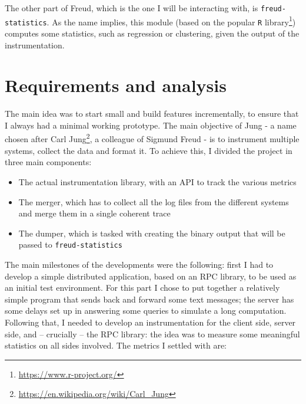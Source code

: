         The other part of Freud, which is the one I will be interacting with, is \texttt{freud-statistics}.
        As the name implies, this module (based on the popular \texttt{R} library\footnote{\url{https://www.r-project.org/}})
        computes some statistics, such as regression or clustering, given the output of the instrumentation.


    \section{Requirements and analysis}\label{sec:requirements}


        The main idea was to start small and build features incrementally, to ensure that I always
        had a minimal working prototype. The main objective of Jung - a name chosen after Carl
        Jung\footnote{\url{https://en.wikipedia.org/wiki/Carl_Jung}},
        a colleague of Sigmund Freud - is to instrument multiple systems, collect the data and format it.
        To achieve this, I divided the project in three main components:

        \begin{itemize}
            \item The actual instrumentation library, with an API to track the various metrics
            \item The merger, which has to collect all the log files from the different systems
             and merge them in a single coherent trace
            \item The dumper, which is tasked with creating the binary output that will be passed
             to \texttt{freud-statistics}
        \end{itemize}

        The main milestones of the developments were the following: first I had to develop a
        simple distributed application, based on an RPC library, to be used as an initial test environment.
        For this part I chose to put together a relatively simple program that sends back and forward
        some text messages; the server has some delays set up in answering some queries to simulate a
        long computation.\\

        Following that, I needed to develop an instrumentation for the client side, server side,
        and – crucially – the RPC library:
        the idea was to measure some meaningful statistics on all sides involved. 
        The metrics I settled with are:

